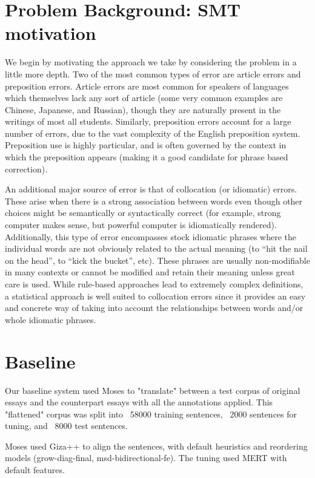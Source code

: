 \documentclass[11pt,letterpaper]{article}
\begin{document}
\section{Problem Background: SMT motivation}
\indent We begin by motivating the approach we take by considering the problem in a little more depth. Two of the 
most common types of error are article errors and preposition errors. 
Article errors are most common for speakers of languages which themselves lack any sort of article 
(some very common examples are Chinese, Japanese, and Russian), though they are naturally present 
in the writings of most all students. Similarly, preposition errors account for a large number of 
errors, due to the vast complexity of the English preposition system. Preposition use is highly particular, 
and is often governed by the context in which the preposition appears (making it a good candidate for 
phrase based correction). \newline

\indent An additional major source of error is that of collocation (or idiomatic) errors. These 
arise when there is a strong association between words even though other choices might be semantically 
or syntactically correct (for example, strong computer makes sense, but powerful computer is idiomatically 
rendered). Additionally, this type of error encompasses stock idiomatic phrases where the individual words 
are not obviously related to the actual meaning (to “hit the nail on the head”, to “kick the bucket”, etc). 
These phrases are usually non-modifiable in many contexts or cannot be modified and retain their meaning 
unless great care is used. While rule-based approaches lead to extremely complex definitions, a 
statistical approach is well suited to collocation errors since it provides an easy and concrete way 
of taking into account the relationships between words and/or whole idiomatic phrases. \newline

\section{Baseline}
Our baseline system used Moses to "translate" between a test corpus of original essays and the counterpart essays with all the annotations applied. This "flattened" corpus was split into ~58000 training sentences, ~2000 sentences for tuning, and ~8000 test sentences. 

Moses used Giza++ to align the sentences, with default heuristics and reordering models (grow-diag-final, msd-bidirectional-fe). The tuning used MERT with default features. 
\end{document}
